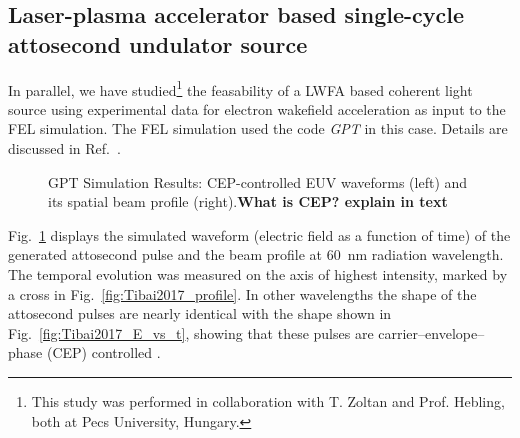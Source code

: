 \subsection{Laser-plasma accelerator based single-cycle attosecond undulator source}
In parallel, we have studied\footnote{This study was performed in collaboration
with T. Zoltan and Prof. Hebling, both at Pecs University, Hungary.} the feasability of a LWFA based coherent light
source using experimental data for electron wakefield acceleration as input to
the FEL simulation. The FEL simulation used the code \textit{GPT} in this case.
Details are discussed in Ref.~\cite{Tibai2017}.
%
\begin{figure}[ht]
  \caption{GPT Simulation Results: CEP-controlled EUV waveforms (left) and its spatial beam
    profile (right).\textbf{What is CEP? explain in text}}
    \label{fig:Tibai2017}
\end{figure}
%
Fig.~\ref{fig:Tibai2017} displays the simulated waveform (electric field as
a function of time)  of the generated attosecond
pulse and the beam profile at \SI{60}{\nano\metre} radiation wavelength. The
temporal evolution was measured on the axis of highest intensity, marked by  a
cross in Fig.~\ref{fig:Tibai2017_profile}. In other
wavelengths the shape of the attosecond pulses are nearly identical with the
shape shown in Fig.~\ref{fig:Tibai2017_E_vs_t}, showing that these pulses are
carrier--envelope--phase (CEP) controlled \cite{Tibai2017}.

